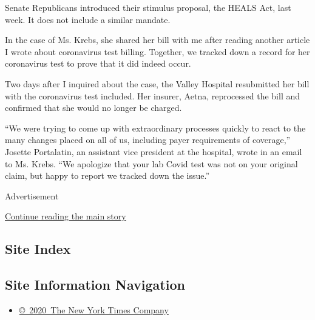 Senate Republicans introduced their stimulus proposal, the HEALS Act,
last week. It does not include a similar mandate.

In the case of Ms. Krebs, she shared her bill with me after reading
another article I wrote about coronavirus test billing. Together, we
tracked down a record for her coronavirus test to prove that it did
indeed occur.

Two days after I inquired about the case, the Valley Hospital
resubmitted her bill with the coronavirus test included. Her insurer,
Aetna, reprocessed the bill and confirmed that she would no longer be
charged.

``We were trying to come up with extraordinary processes quickly to
react to the many changes placed on all of us, including payer
requirements of coverage,'' Josette Portalatin, an assistant vice
president at the hospital, wrote in an email to Ms. Krebs. ``We
apologize that your lab Covid test was not on your original claim, but
happy to report we tracked down the issue.''

Advertisement

\protect\hyperlink{after-bottom}{Continue reading the main story}

\hypertarget{site-index}{%
\subsection{Site Index}\label{site-index}}

\hypertarget{site-information-navigation}{%
\subsection{Site Information
Navigation}\label{site-information-navigation}}

\begin{itemize}
\tightlist
\item
  \href{https://help.nytimes3xbfgragh.onion/hc/en-us/articles/115014792127-Copyright-notice}{©~2020~The
  New York Times Company}
\end{itemize}

